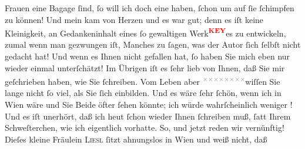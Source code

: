 \begin{ledgroupsized}[t]{13cm}
               Frauen eine Bagage ſind, ſo will ich doch eine haben, ſchon um auf {\pb}ſie ſchimpfen zu können! Und mein \label{K_L03525-4v}\label{K_L03525-4h} kam von Herzen und
               es war gut; denn es iſt \strikeout{\textcolor{gray}{Ar}} keine Kleinigkeit, an Gedankeninhalt eines ſo gewaltigen Werk\textcolor{red}{\textsuperscript{\textbf{KEY}}}es zu entwickeln, zumal wenn man gezwungen iſt,
               Manches zu ſagen, was der Autor ſich ſelbſt nicht gedacht hat! Und wenn es Ihnen  nicht gefallen hat, ſo haben Sie mich eben nur wieder einmal unterſchätzt! Im
               Übrigen iſt es  ſehr lieb
               von Ihnen, daß Sie mir geſchrieben haben, wie Sie ſchreiben. Vom Leben aber {\pb}\substVorne{}\textsuperscript{\textcolor{gray}{×}\-\textcolor{gray}{×}\-\textcolor{gray}{×}\-\textcolor{gray}{×}\-\textcolor{gray}{×}\-\textcolor{gray}{×}\-\textcolor{gray}{×}\-\textcolor{gray}{×}}\substDazwischen{}wiſſen\substHinten{} Sie lange nicht ſo viel, als Sie ſich einbilden. Und es wäre ſehr ſchön,
               wenn ich in Wien wäre und Sie Beide öfter ſehen könnte; ich würde
               wahrſcheinlich weniger \label{K_L03525-11v}\label{K_L03525-11h}! Und es iſt unerhört, daß ich heut ſchon
               wieder Ihnen ſchreiben muß, ſatt Ihrem Schweſterchen, wie ich eigentlich vorhatte.\pend
           \pstart
           So, und jetzt reden wir vernünftig!\pend
           \pstart
           Dieſes kleine Fräulein \textsc{Liesl} ſitzt ahnungslos in Wien und weiß nicht, daß
                  \label{K_L03525-12v}\label{K_L03525-12h}

\end{ledgroupsized}

